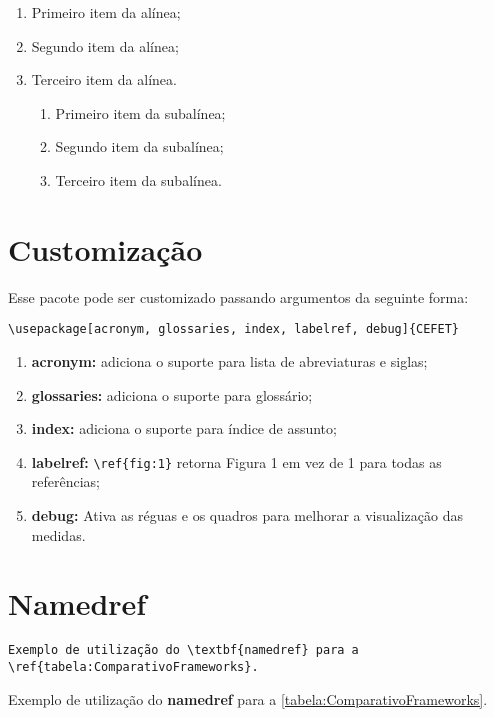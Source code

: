 \begin{enumerate}
    \item Primeiro item da alínea;
    \item Segundo item da alínea;
    \item Terceiro item da alínea.
          \begin{enumerate}
              \item Primeiro item da subalínea;
              \item Segundo item da subalínea;
              \item Terceiro item da subalínea.
          \end{enumerate}
\end{enumerate}

\section{Customização}

Esse pacote pode ser customizado passando argumentos da seguinte forma:
\begin{verbatim}
\usepackage[acronym, glossaries, index, labelref, debug]{CEFET}
\end{verbatim}

\begin{enumerate}
    \item \textbf{acronym:} adiciona o suporte para lista de abreviaturas e siglas;
    \item \textbf{glossaries:} adiciona o suporte para glossário;
    \item \textbf{index:} adiciona o suporte para índice de assunto;
    \item \textbf{labelref:} \verb|\ref{fig:1}| retorna Figura 1 em vez de 1 para todas as referências;
    \item \textbf{debug:} Ativa as réguas e os quadros para melhorar a visualização das medidas.
\end{enumerate}

\section{Namedref}
\begin{verbatim}
Exemplo de utilização do \textbf{namedref} para a 
\ref{tabela:ComparativoFrameworks}.
\end{verbatim}
Exemplo de utilização do \textbf{namedref} para a \ref{tabela:ComparativoFrameworks}.